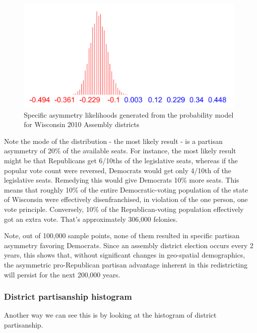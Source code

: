 \documentclass[preprint,12pt]{article}
\begin{document}
\begin{figure}[htb!]
    \begin{center}
        \includegraphics[scale=0.5]{../Figures/WI2010/asymmetry_alt.png}
        \caption{Specific asymmetry likelihoods generated from the probability model for Wisconsin 2010 Assembly districts}\label{fig:LikelihoodsAsymmetry}
    \end{center}
\end{figure}
 
Note the mode of the distribution - the most likely result - is a partisan asymmetry of 20\% of the available seats.  For instance, the most likely result might be that Republicans get 6/10ths of the legislative seats, whereas if the popular vote count were reversed, Democrats would get only 4/10th of the legislative seats.  Remedying this would give Democrats 10\% more seats.  This means that roughly 10\% of the entire Democratic-voting population of the state of Wisconsin were effectively disenfranchised, in violation of the one person, one vote principle.  Conversely, 10\% of the Republican-voting population effectively got an extra vote.  That's approximately 306,000 felonies.
 
Note, out of 100,000 sample points, none of them resulted in specific partisan asymmetry favoring Democrats.  Since an assembly district election occurs every 2 years, this shows that, without significant changes in geo-spatial demographics, the asymmetric pro-Republican partisan advantage inherent in this redistricting will persist for the next 200,000 years.

\subsubsection{District partisanship histogram}
 
Another way we can see this is by looking at the histogram of district partisanship.
 
\end{document}
